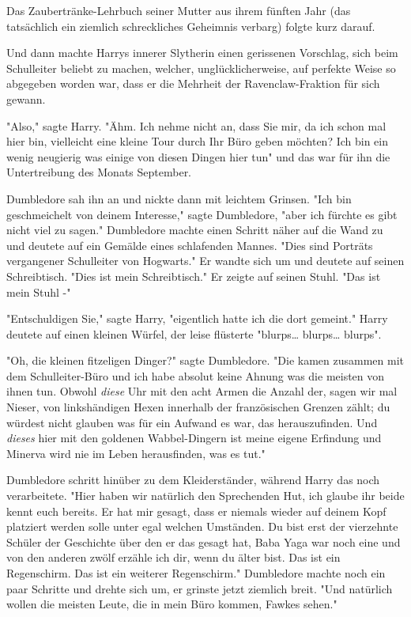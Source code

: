 {Das Zaubertränke-Lehrbuch seiner Mutter aus ihrem fünften Jahr (das tatsächlich ein ziemlich schreckliches Geheimnis verbarg) folgte kurz darauf.

Und dann machte Harrys innerer Slytherin einen gerissenen Vorschlag, sich beim Schulleiter beliebt zu machen, welcher, unglücklicherweise, auf perfekte Weise so abgegeben worden war, dass er die Mehrheit der Ravenclaw-Fraktion für sich gewann.

"Also," sagte Harry. "Ähm. Ich nehme nicht an, dass Sie mir, da ich schon mal hier bin, vielleicht eine kleine Tour durch Ihr Büro geben möchten? Ich bin ein wenig neugierig was einige von diesen Dingen hier tun" und das war für ihn die Untertreibung des Monats September.

Dumbledore sah ihn an und nickte dann mit leichtem Grinsen. "Ich bin geschmeichelt von deinem Interesse," sagte Dumbledore, "aber ich fürchte es gibt nicht viel zu sagen." Dumbledore machte einen Schritt näher auf die Wand zu und deutete auf ein Gemälde eines schlafenden Mannes. "Dies sind Porträts vergangener Schulleiter von Hogwarts." Er wandte sich um und deutete auf seinen Schreibtisch. "Dies ist mein Schreibtisch." Er zeigte auf seinen Stuhl. "Das ist mein Stuhl -"

"Entschuldigen Sie," sagte Harry, "eigentlich hatte ich die dort gemeint." Harry deutete auf einen kleinen Würfel, der leise flüsterte "blurps… blurps… blurps".

"Oh, die kleinen fitzeligen Dinger?" sagte Dumbledore. "Die kamen zusammen mit dem Schulleiter-Büro und ich habe absolut keine Ahnung was die meisten von ihnen tun. Obwohl \emph{diese} Uhr mit den acht Armen die Anzahl der, sagen wir mal Nieser, von linkshändigen Hexen innerhalb der französischen Grenzen zählt; du würdest nicht glauben was für ein Aufwand es war, das herauszufinden. Und \emph{dieses} hier mit den goldenen Wabbel-Dingern ist meine eigene Erfindung und Minerva wird nie im Leben herausfinden, was es tut."

Dumbledore schritt hinüber zu dem Kleiderständer, während Harry das noch verarbeitete. "Hier haben wir natürlich den Sprechenden Hut, ich glaube ihr beide kennt euch bereits. Er hat mir gesagt, dass er niemals wieder auf deinem Kopf platziert werden solle unter egal welchen Umständen. Du bist erst der vierzehnte Schüler der Geschichte über den er das gesagt hat, Baba Yaga war noch eine und von den anderen zwölf erzähle ich dir, wenn du älter bist. Das ist ein Regenschirm. Das ist ein weiterer Regenschirm." Dumbledore machte noch ein paar Schritte und drehte sich um, er grinste jetzt ziemlich breit. "Und natürlich wollen die meisten Leute, die in mein Büro kommen, Fawkes sehen."

}
